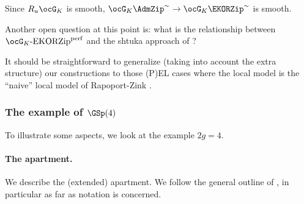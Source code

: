 \documentclass[a4paper]{scrartcl} %
\numberwithin{equation}{section}
\begin{document}
\begin{Remark}\label{redRusmooth}
  Since $R_u\ocG_K$ is smooth, $\ocG_K\AdmZip^\sim \to \ocG_K\EKORZip^\sim$ is smooth.
\end{Remark}


\begin{Remark}
  Another open question at this point is: what is the relationship between $\ocG_K\text{-EKORZip}^\mathrm{perf}$ and the shtuka approach of \cite[Section~4]{SYZnew}?
\end{Remark}


\begin{Remark}
  It should be straightforward to generalize (taking into account the extra structure) our constructions to those (P)EL cases where the local model is the ``naive'' local model of Rapoport-Zink \cite{rz}.
\end{Remark}


\subsubsection{The example of \texorpdfstring{$\GSp(4)$}{GSp(4)}}
\label{sec:example-gsp4}

To illustrate some aspects, we look at the example $2g=4$. 

\paragraph{The apartment.}
\label{sec:apartment}

We describe the (extended) apartment. We follow the general outline of \cite{landvogt}, in particular as far as notation is concerned.
\end{document}
